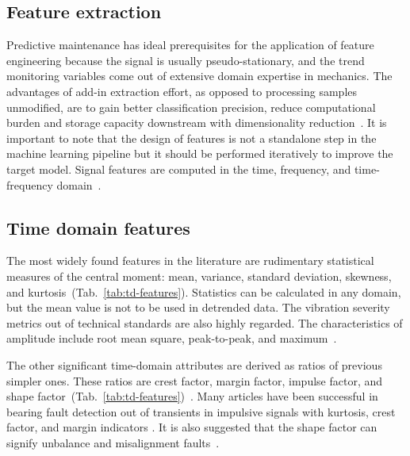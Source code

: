 \subsection{Feature extraction}
Predictive maintenance has ideal prerequisites for the application of feature engineering because the signal is usually pseudo-stationary, and the trend monitoring variables come out of extensive domain expertise in mechanics. The advantages of add-in extraction effort, as opposed to processing samples unmodified, are to gain better classification precision, reduce computational burden and storage capacity downstream with dimensionality reduction~\cite{johnson_feature_2019}. It is important to note that the design of features is not a standalone step in the machine learning pipeline but it should be performed iteratively to improve the target model.  Signal features are computed in the time, frequency, and time-frequency domain~\cite{brito_fault_2021}. 

\subsection{Time domain features}
The most widely found features in the literature are rudimentary statistical measures of the central moment: mean, variance, standard deviation, skewness, and kurtosis~(Tab.~\ref{tab:td-features}). Statistics can be calculated in any domain, but the mean value is not to be used in detrended data. The vibration severity metrics out of technical standards are also highly regarded. The characteristics of amplitude include root mean square, peak-to-peak, and maximum~\cite{mostafavi_novel_2021}.

The other significant time-domain attributes are derived as ratios of previous simpler ones. These ratios are crest factor, margin factor, impulse factor, and shape factor~(Tab.~\ref{tab:td-features})~\cite{nandi_condition_2019}. Many articles have been successful in bearing fault detection out of transients in impulsive signals with kurtosis, crest factor, and margin indicators \cite{brito_fault_2021}. It is also suggested that the shape factor can signify unbalance and misalignment faults~\cite{nandi_condition_2019}.

